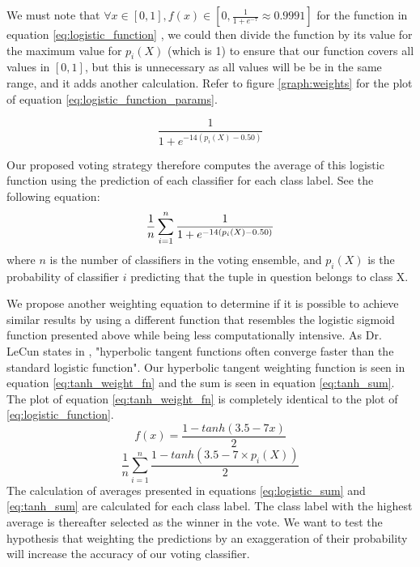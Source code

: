 We must note that $\forall x \in [0,1], f(x) \in [0, \frac{1}{1+e^{-7}}\approx 0.9991]$ for the function in equation \ref{eq:logistic_function} , we could then divide the function by its value for the maximum value for $p_i(X)$ (which is 1) to ensure that our function covers all values in $[0,1]$, but this is unnecessary as all values will be be in the same range, and it adds another calculation.
Refer to figure \ref{graph:weights} for the plot of equation \ref{eq:logistic_function_params}.

\begin{equation}
\frac{1}{1+e^{-14(p_i(X)-0.50)}}
\label{eq:logistic_function_params}
\end{equation}

Our proposed voting strategy therefore computes the average of this logistic function using the prediction of each classifier for each class label. See the following equation:
\begin{equation}
\frac{1}{n}\sum_{i=1}^{n}\frac{1}{1+e^{-14(p_i(X)-0.50)}}\\ 
    \label{eq:logistic_sum}
\end{equation}
where $n$ is the number of classifiers in the voting ensemble, and $p_i(X)$ is the probability of classifier $i$ predicting that the tuple in question belongs to class X.

We propose another weighting equation to determine if it is possible to achieve similar results by using a different function that resembles the logistic sigmoid function presented above while being less computationally intensive. As Dr. LeCun states in \citep[10]{lecun2012efficient},  "hyperbolic tangent functions often converge faster than the standard logistic function".
Our hyperbolic tangent weighting function is seen in equation \ref{eq:tanh_weight_fn} and the sum is seen in equation \ref{eq:tanh_sum}. The plot of equation \ref{eq:tanh_weight_fn} is completely identical to the plot of \ref{eq:logistic_function}.
\begin{equation}
    f(x)=\frac{1-tanh(3.5-7x)}{2}
    \label{eq:tanh_weight_fn}
\end{equation}
\begin{equation}
\frac{1}{n}\sum_{i=1}^{n} \frac{1-tanh(3.5-7\times p_i(X))}{2}
    \label{eq:tanh_sum}
\end{equation}
The calculation of averages presented in equations \ref{eq:logistic_sum} and \ref{eq:tanh_sum} are calculated for each class label. The class label with the highest average is thereafter selected as the winner in the vote. We want to test the hypothesis that weighting the predictions by an exaggeration of their probability will increase the accuracy of our voting classifier.

